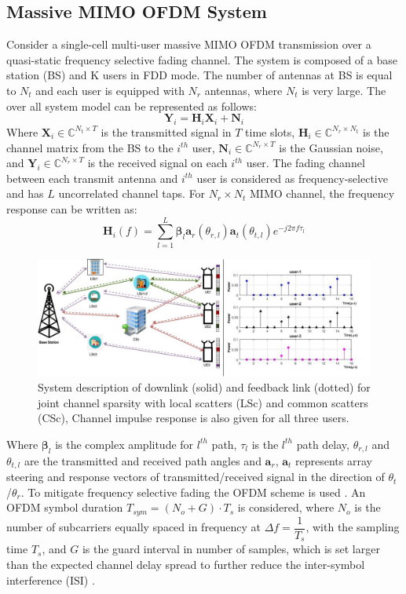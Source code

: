 \subsection{Massive MIMO OFDM System}
 Consider a single-cell multi-user massive MIMO OFDM transmission over a quasi-static frequency selective fading channel. The system is composed of a base station (BS) and K users in FDD mode. The number of antennas at BS is equal to $N_t$ and each user is equipped with $N_r$ antennas, where $N_t$ is very large.  The over all system model can be represented as follows: 
\begin{equation}
\mathbf{Y}_{i} = \mathbf{H}_i \mathbf{X}_i + \mathbf{N}_i
\label{eq_channel}
\end{equation}
Where $\mathbf{X}_i  \in \mathbb{C}^{N_t \times T}$ is the transmitted signal in $T$ time slots, $ \mathbf{H}_i \in \mathbb{C}^{N_r \times N_t}$ is the channel matrix from the BS to the $i^{th}$ user, $\mathbf{N}_i  \in \mathbb{C}^{N_r \times T}$ is the Gaussian  noise, and $\mathbf{Y}_{i} \in \mathbb{C}^{N_r \times T}$ is the received signal on each $i^{th}$ user.  
The fading channel between each transmit antenna and $i^{th}$ user is considered as frequency-selective and has $L$ uncorrelated channel taps. For $N_r \times N_t$ MIMO channel, the frequency response can be written as:
\begin{equation}
     \mathbf{H}_i(f)= \sum_{l=1}^L \mathbf{\beta}_l \mathbf{a}_r(\theta_{r,l}) \mathbf{a}_t(\theta_{t,l}) e^{-j2\pi f \tau_l}
\end{equation}

\begin{figure}
\centering
\includegraphics[scale=0.37]{figures/fig_ch_rec/joint_channelplus_cir.jpg}
\caption{System description of downlink (solid) and feedback link (dotted) for joint channel sparsity with local scatters (LSc) and common scatters (CSc), Channel impulse response is also given for all three users.}
\label{sys_fig}
\end{figure}
Where $\mathbf{\beta}_l$ is the complex amplitude for $l^{th}$ path, $\tau_l$ is the  $l^{th}$  path delay, $\theta_{r,l}$ and $\theta_{t,l}$ are the transmitted and received path angles and $\mathbf{a}_r$, $\mathbf{a}_t$ represents array steering and response vectors of transmitted/received signal in the direction of $\theta_t$/$\theta_r$. To mitigate frequency selective fading the OFDM scheme is used \cite{reviwsparse,CRRM2011,Vizziello2013}. An OFDM symbol duration $T_{sym}=(N_o+G)\cdot T_s$ is considered, where $N_o$ is the number of subcarriers equally spaced in frequency at ${\Delta} f=\dfrac{1}{T_s}$, with the sampling time $T_s$, and $G$ is the guard interval in number of samples, which is set larger than the expected channel delay spread to further reduce the inter-symbol interference (ISI) \cite{reviwsparse}. 
\label{formulation}
